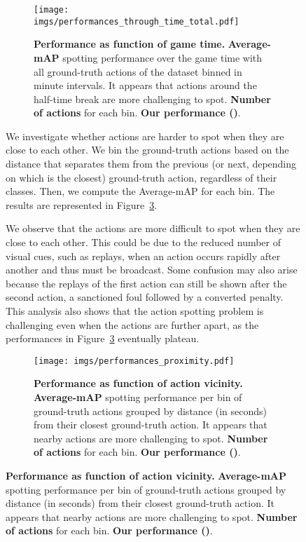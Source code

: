 \documentclass[10pt,twocolumn,letterpaper]{article}
\begin{document}
\begin{figure}[t]
{\begin{minipage}{\linewidth}
\begin{figure}
    \centering
    \texttt{[image: imgs/performances\_through\_time\_total.pdf]}
    \caption{\textbf{Performance as function of game time.} 
    {\color{anthoorange}\textbf{Average-mAP}} spotting performance over the game time with all ground-truth actions of the dataset binned in  minute intervals. 
    It appears that actions around the half-time break are more challenging to spot.
    {\color{anthoblue}\textbf{Number of actions}} for each bin.
    {\color{mygray}\textbf{Our performance ()}}.}
    \label{fig:perfs-through-time}
\end{figure}




We investigate whether actions are harder to spot when they are close to each other. We bin the ground-truth actions based on the distance that separates them from the previous (or next, depending on which is the closest) ground-truth action, regardless of their classes. Then, we compute the Average-mAP for each bin. The results are represented in Figure~\ref{fig:perfs-closeness}. 

We observe that the actions are more difficult to spot when they are close to each other. This could be due to the reduced number of visual cues, such as replays, when an action occurs rapidly after another and thus must be broadcast. Some confusion may also arise because the replays of the first action can still be shown after the second action, \eg a sanctioned foul followed by a converted penalty.
This analysis also shows that the action spotting problem is challenging even when the actions are further apart, as the performances in Figure~\ref{fig:perfs-closeness} eventually plateau.

\begin{figure}
    \centering
    \texttt{[image: imgs/performances\_proximity.pdf]}
    \caption{\textbf{Performance as function of action vicinity.} 
    {\color{anthoorange}\textbf{Average-mAP}} spotting performance per bin of ground-truth actions grouped by distance (in seconds) from their closest  ground-truth action.
    It appears that nearby actions are more challenging to spot.
    {\color{anthoblue}\textbf{Number of actions}} for each bin.
    {\color{mygray}\textbf{Our performance ()}}.}
    \label{fig:perfs-closeness}
\end{figure}






\end{minipage}}
\end{figure}
\end{document}
